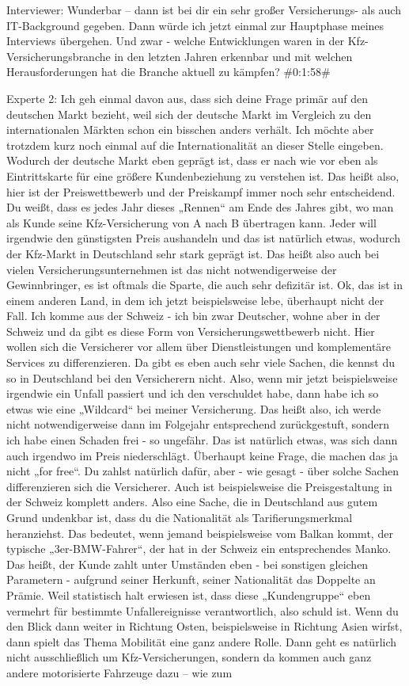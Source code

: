 Interviewer:
Wunderbar – dann ist bei dir ein sehr großer Versicherungs- als auch IT-Background gegeben. Dann würde ich jetzt einmal zur Hauptphase meines Interviews übergehen. Und zwar - welche Entwicklungen waren in der Kfz- Versicherungsbranche in den letzten Jahren erkennbar und mit welchen Herausforderungen hat die Branche aktuell zu kämpfen?
\#0:1:58\#

Experte 2:
Ich geh einmal davon aus, dass sich deine Frage primär auf den deutschen Markt bezieht, weil sich der deutsche Markt im Vergleich zu den internationalen Märkten schon ein bisschen anders verhält. Ich möchte aber trotzdem kurz noch einmal auf die Internationalität an dieser Stelle eingeben. Wodurch der deutsche Markt eben geprägt ist, dass er nach wie vor eben als Eintrittskarte für eine größere Kundenbeziehung zu verstehen ist. Das heißt also, hier ist der Preiswettbewerb und der Preiskampf immer noch sehr entscheidend. Du weißt, dass es jedes Jahr dieses „Rennen“ am Ende des Jahres gibt, wo man als Kunde seine Kfz-Versicherung von A nach B übertragen kann. Jeder will irgendwie den günstigsten Preis aushandeln und das ist natürlich etwas, wodurch der Kfz-Markt in Deutschland sehr stark geprägt ist. Das heißt also auch bei vielen Versicherungsunternehmen ist das nicht notwendigerweise der Gewinnbringer, es ist oftmals die Sparte, die auch sehr defizitär ist. Ok, das ist in einem anderen Land, in dem ich jetzt beispielsweise lebe, überhaupt nicht der Fall. Ich komme aus der Schweiz - ich bin zwar Deutscher, wohne aber in der Schweiz und da gibt es diese Form von Versicherungswettbewerb nicht. Hier wollen sich die Versicherer vor allem über Dienstleistungen und komplementäre Services zu differenzieren. Da gibt es eben auch sehr viele Sachen, die kennst du so in Deutschland bei den Versicherern nicht. Also, wenn mir jetzt beispielsweise irgendwie ein Unfall passiert und ich den verschuldet habe, dann habe ich so etwas wie eine „Wildcard“ bei meiner Versicherung. Das heißt also, ich werde nicht notwendigerweise dann im Folgejahr entsprechend zurückgestuft, sondern ich habe einen Schaden frei - so ungefähr. Das ist natürlich etwas, was sich dann auch irgendwo im Preis niederschlägt. Überhaupt keine Frage, die machen das ja nicht „for free“. Du zahlst natürlich dafür, aber - wie gesagt - über solche Sachen differenzieren sich die Versicherer. Auch ist beispielsweise die Preisgestaltung in der Schweiz komplett anders. Also eine Sache, die in Deutschland aus gutem Grund undenkbar ist, dass du die Nationalität als Tarifierungsmerkmal heranziehst. Das bedeutet, wenn jemand beispielsweise vom Balkan kommt, der typische „3er-BMW-Fahrer“, der hat in der Schweiz ein entsprechendes Manko. Das heißt, der Kunde zahlt unter Umständen eben - bei sonstigen gleichen Parametern - aufgrund seiner Herkunft, seiner Nationalität das Doppelte an Prämie. Weil statistisch halt erwiesen ist, dass diese „Kundengruppe“ eben vermehrt für bestimmte Unfallereignisse verantwortlich, also schuld ist. Wenn du den Blick dann weiter in Richtung Osten, beispielsweise in Richtung Asien wirfst, dann spielt das Thema Mobilität eine ganz andere Rolle. Dann geht es natürlich nicht ausschließlich um Kfz-Versicherungen, sondern da kommen auch ganz andere motorisierte Fahrzeuge dazu – wie zum 
